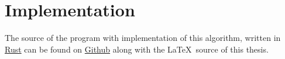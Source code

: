 \section{Implementation}\label{implementation}
The source of the program with implementation of this algorithm, written in 
\href{https://www.rust-lang.org/}{Rust} can be found 
on
\href{https://github.com/Sooyka/praca_magisterska_orbifoldy}{Github} 
along with the \LaTeX\ source of 
this thesis.




